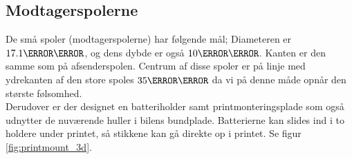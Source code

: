 \subsection{Modtagerspolerne}
De små spoler (modtagerspolerne) har følgende mål; 
Diameteren er $17.1\milli\meter$, og dens dybde er også $10\milli\meter$. Kanten er den samme som på afsenderspolen. Centrum af disse spoler er på linje med ydrekanten af den store spoles $35\milli\meter$ da vi på denne måde opnår den største følsomhed. \\

Derudover er der designet en batteriholder samt printmonteringsplade som også udnytter de nuværende huller i bilens bundplade. Batterierne kan slides ind i to holdere under printet, så stikkene kan gå direkte op i printet. Se figur \ref{fig:printmount_3d}.\\
